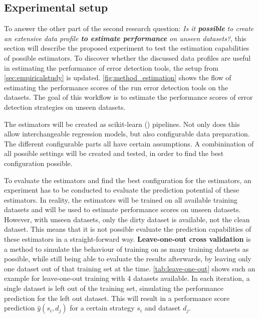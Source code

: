 \subsection{Experimental setup}
To answer the other part of the second research question: \textit{Is it  \textbf{possible} to create an extensive data profile \textbf{to estimate performance} on unseen datasets?}, this section will describe the proposed experiment to test the estimation capabilities of possible estimators. 
To discover whether the discussed data profiles are useful in estimating the performance of error detection tools, the setup from \autoref{sec:empiricalstudy} is updated. \autoref{fig:method_estimation} shows the flow of estimating the performance scores of the run error detection tools on the datasets. The goal of this workflow is to estimate the performance scores of error detection strategies on unseen datasets.

The estimators will be created as scikit-learn (\cite{Pedregosa2011-su}) pipelines. Not only does this allow interchangeable regression models, but also configurable data preparation. The different configurable parts all have certain assumptions. A combinination of all possible settings will be created and tested, in order to find the best configuration possible.

To evaluate the estimators and find the best configuration for the estimators, an experiment has to be conducted to evaluate the prediction potential of these estimators.
In reality, the estimators will be trained on all available training datasets and will be used to estimate performance scores on unseen datasets. However, with unseen datasets, only the dirty dataset is available, not the clean dataset. This means that it is not possible evaluate the prediction capabilities of these estimators in a straight-forward way.
\textbf{Leave-one-out cross validation} is a method to simulate the behaviour of training on as many training datasets as possible, while still being able to evaluate the results afterwards, by leaving only one dataset out of that training set at the time. \autoref{tab:leave-one-out} shows such an example for leave-one-out training with 4 datasets available. In each iteration, a single dataset is left out of the training set, simulating the performance prediction for the left out dataset. This will result in a performance score prediction $\hat{y}(s_i, d_j)$ for a certain strategy $s_i$ and dataset $d_j$. 


